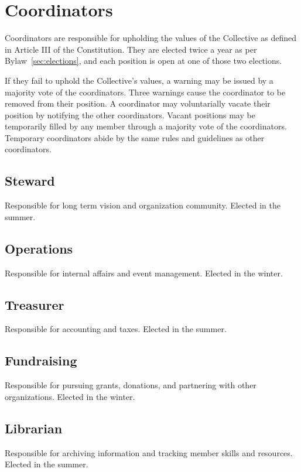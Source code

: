 \chapter{Coordinators}\label{sec:coordinators}

Coordinators are responsible for upholding the values of the Collective as defined in Article III of the Constitution. They are elected twice a year as per Bylaw~\ref{sec:elections}, and each position is open at one of those two elections.

If they fail to uphold the Collective's values, a warning may be issued by a majority vote of the coordinators. Three warnings cause the coordinator to be removed from their position. A coordinator may voluntarially vacate their position by notifying the other coordinators. Vacant positions may be temporarily filled by any member through a majority vote of the coordinators. Temporary coordinators abide by the same rules and guidelines as other coordinators.

\section{Steward}\label{sec:steward}
Responsible for long term vision and organization community. Elected in the summer.

\section{Operations}\label{sec:operations}
Responsible for internal affairs and event management. Elected in the winter.

\section{Treasurer}\label{sec:treasurer}
Responsible for accounting and taxes. Elected in the summer.

\section{Fundraising}\label{sec:fundraising}
Responsible for pursuing grants, donations, and partnering with other organizations. Elected in the winter.

\section{Librarian}\label{sec:librarian}
Responsible for archiving information and tracking member skills and resources. Elected in the summer.

